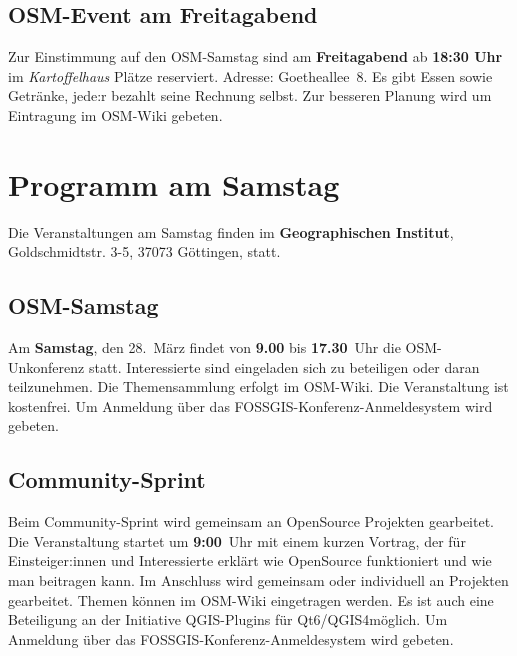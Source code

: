 \subsection*{OSM-Event am Freitagabend}
Zur Einstimmung auf den OSM-Samstag sind am {\bfseries Freitagabend}  ab {\bfseries 18:30 Uhr} im {\em Kartoffelhaus} Plätze reserviert. Adresse: Goethe\-allee~8. Es gibt Essen sowie Getränke, jede:r bezahlt seine Rechnung selbst. Zur besseren Planung wird um Eintragung im OSM-Wiki gebeten.
\newpage
\section*{Programm am Samstag}
\noindent
Die Veranstaltungen am Samstag finden im {\bfseries Geographischen Institut}, Goldschmidtstr. 3-5,
37073 Göttingen, statt.

\subsection*{OSM-Samstag}
Am {\bfseries Samstag}, den 28.~März findet von {\bfseries 9.00} bis {\bfseries 17.30}~Uhr die OSM-Unkonferenz statt.
Interessierte sind eingeladen sich zu beteiligen oder daran teilzunehmen.
Die Themensammlung erfolgt im OSM-Wiki. Die Veranstaltung ist kostenfrei.
Um Anmeldung über das FOSSGIS-Konferenz-Anmeldesystem wird gebeten.

\subsection*{Community-Sprint}
Beim Community-Sprint wird gemeinsam an OpenSource Projekten gearbeitet.
Die Veranstaltung startet um {\bfseries 9:00}~Uhr mit einem kurzen Vortrag, der für Einsteiger:innen
und Interessierte erklärt wie OpenSource funktioniert und wie man beitragen kann.
Im Anschluss wird gemeinsam oder individuell an Projekten gearbeitet. Themen können im OSM-Wiki
eingetragen werden. Es ist auch eine Beteiligung an der Initiative \glqq QGIS-Plugins für Qt6/QGIS4\grqq möglich.
Um Anmeldung über das FOSSGIS-Konferenz-Anmeldesystem wird gebeten.

